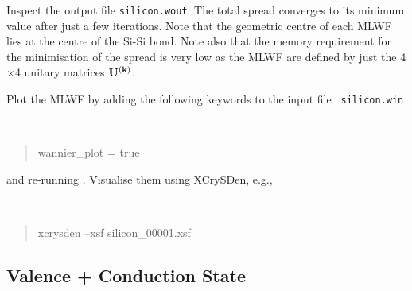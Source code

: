 \documentclass[a4paper,11pt,twoside]{article}
\begin{document}
Inspect the output file {\tt silicon.wout}. The total spread converges to its
minimum value after just a few iterations. Note that the geometric centre of
each MLWF lies at the centre of the Si-Si bond.
Note also that the memory requirement for the minimisation of
the spread is very low as the MLWF are defined 
by just the 4$\times$4 unitary matrices $\mathbf{U}^{(\mathbf{k})}$. 

Plot the MLWF by adding the following keywords to the input file {\tt
  silicon.win} 
{\tt
\begin{quote}
wannier\_plot = true
\end{quote} }
and re-running \wannier. Visualise them using XCrySDen, e.g.,
{\tt
\begin{quote}
xcrysden --xsf silicon\_00001.xsf
\end{quote} }

\subsection*{Valence + Conduction State}
\end{document}
